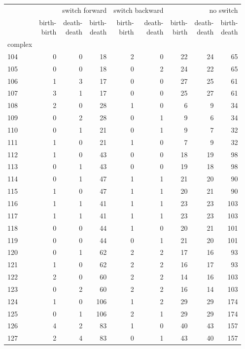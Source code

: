 \documentclass{article}
\begin{document}
\begin{center}
\begin{tabular}{lrrrrrrrr}
\toprule
& \multicolumn{3}{r}{switch forward} & \multicolumn{2}{r}{switch backward} & \multicolumn{3}{r}{no switch} \\
& \makecell{birth-\\birth} & \makecell{death-\\death} & \makecell{birth-\\death} & \makecell{birth-\\birth} & \makecell{death-\\death} & \makecell{birth-\\birth} & \makecell{death-\\death} & \makecell{birth-\\death} \\
complex &  &  &  &  &  &  &  &  \\
\midrule
104 & 0 & 0 & 18 & 2 & 0 & 22 & 24 & 65 \\
105 & 0 & 0 & 18 & 0 & 2 & 24 & 22 & 65 \\
106 & 1 & 3 & 17 & 0 & 0 & 27 & 25 & 61 \\
107 & 3 & 1 & 17 & 0 & 0 & 25 & 27 & 61 \\
108 & 2 & 0 & 28 & 1 & 0 & 6 & 9 & 34 \\
109 & 0 & 2 & 28 & 0 & 1 & 9 & 6 & 34 \\
110 & 0 & 1 & 21 & 0 & 1 & 9 & 7 & 32 \\
111 & 1 & 0 & 21 & 1 & 0 & 7 & 9 & 32 \\
112 & 1 & 0 & 43 & 0 & 0 & 18 & 19 & 98 \\
113 & 0 & 1 & 43 & 0 & 0 & 19 & 18 & 98 \\
114 & 0 & 1 & 47 & 1 & 1 & 21 & 20 & 90 \\
115 & 1 & 0 & 47 & 1 & 1 & 20 & 21 & 90 \\
116 & 1 & 1 & 41 & 1 & 1 & 23 & 23 & 103 \\
117 & 1 & 1 & 41 & 1 & 1 & 23 & 23 & 103 \\
118 & 0 & 0 & 44 & 1 & 0 & 20 & 21 & 101 \\
119 & 0 & 0 & 44 & 0 & 1 & 21 & 20 & 101 \\
120 & 0 & 1 & 62 & 2 & 2 & 17 & 16 & 93 \\
121 & 1 & 0 & 62 & 2 & 2 & 16 & 17 & 93 \\
122 & 2 & 0 & 60 & 2 & 2 & 14 & 16 & 103 \\
123 & 0 & 2 & 60 & 2 & 2 & 16 & 14 & 103 \\
124 & 1 & 0 & 106 & 1 & 2 & 29 & 29 & 174 \\
125 & 0 & 1 & 106 & 2 & 1 & 29 & 29 & 174 \\
126 & 4 & 2 & 83 & 1 & 0 & 40 & 43 & 157 \\
127 & 2 & 4 & 83 & 0 & 1 & 43 & 40 & 157 \\
\bottomrule
\end{tabular}

\end{center}
\end{document}
